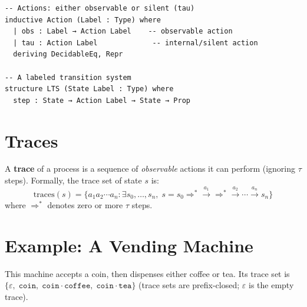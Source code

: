 \documentclass[11pt, a4paper, oneside]{book}
\newcommand{\Reduces}{\Longrightarrow}
\begin{document}
\begin{leanbox}
\begin{verbatim}
-- Actions: either observable or silent (tau)
inductive Action (Label : Type) where
  | obs : Label → Action Label    -- observable action
  | tau : Action Label             -- internal/silent action
  deriving DecidableEq, Repr

-- A labeled transition system
structure LTS (State Label : Type) where
  step : State → Action Label → State → Prop
\end{verbatim}
\end{leanbox}

\section{Traces}

A \textbf{trace} of a process is a sequence of \emph{observable} actions it
can perform (ignoring $\tau$ steps). Formally, the trace set of state $s$ is:
\[
  \mathrm{traces}(s) = \{a_1 a_2 \cdots a_n :
    \exists s_0, \ldots, s_n,\;
    s = s_0 \Reduces^{*} \xrightarrow{a_1} \Reduces^{*}
    \xrightarrow{a_2} \cdots \xrightarrow{a_n} s_n \}
\]
where $\Reduces^{*}$ denotes zero or more $\tau$ steps.

\section{Example: A Vending Machine}

\begin{center}
\end{center}

This machine accepts a coin, then dispenses either coffee or tea. Its trace
set is $\{\varepsilon,\; \texttt{coin},\; \texttt{coin}\cdot\texttt{coffee},\;
\texttt{coin}\cdot\texttt{tea}\}$ (trace sets are prefix-closed; $\varepsilon$
is the empty trace).
\end{document}
